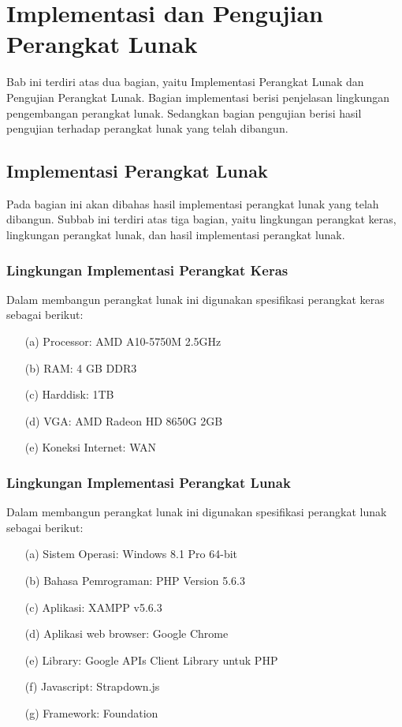 \chapter{Implementasi dan Pengujian Perangkat Lunak}
\label{chap:implementasidanpengujian}

Bab ini terdiri atas dua bagian, yaitu Implementasi Perangkat Lunak dan
Pengujian Perangkat Lunak. Bagian implementasi berisi penjelasan lingkungan
pengembangan perangkat lunak. Sedangkan bagian pengujian berisi hasil pengujian
terhadap perangkat lunak yang telah dibangun.

\section{Implementasi Perangkat Lunak}
\label{sec:implementasiperangkatlunak}

Pada bagian ini akan dibahas hasil implementasi perangkat lunak yang telah
dibangun. Subbab ini terdiri atas tiga bagian, yaitu lingkungan perangkat keras,
lingkungan perangkat lunak, dan hasil implementasi perangkat lunak.

\subsection{Lingkungan Implementasi Perangkat Keras}
\label{sec:lingkunganimplementasiperangkatkeras}

Dalam membangun perangkat lunak ini digunakan spesifikasi perangkat keras sebagai berikut:

\begin{enumerate}
\item[(a)] Processor: AMD A10-5750M 2.5GHz
\item[(b)] RAM: 4 GB DDR3
\item[(c)] Harddisk: 1TB
\item[(d)] VGA: AMD Radeon HD 8650G 2GB
\item[(e)] Koneksi Internet: WAN
\end{enumerate}

\subsection{Lingkungan Implementasi Perangkat Lunak}
\label{sec:lingkunganimplementasiperangkatlunak}

Dalam membangun perangkat lunak ini digunakan spesifikasi perangkat lunak sebagai berikut:

\begin{enumerate}
\item[(a)] Sistem Operasi: Windows 8.1 Pro 64-bit
\item[(b)] Bahasa Pemrograman: PHP Version 5.6.3
\item[(c)] Aplikasi: XAMPP v5.6.3
\item[(d)] Aplikasi web browser: Google Chrome
\item[(e)] Library: Google APIs Client Library untuk PHP
\item[(f)] Javascript: Strapdown.js
\item[(g)] Framework: Foundation
\end{enumerate}

